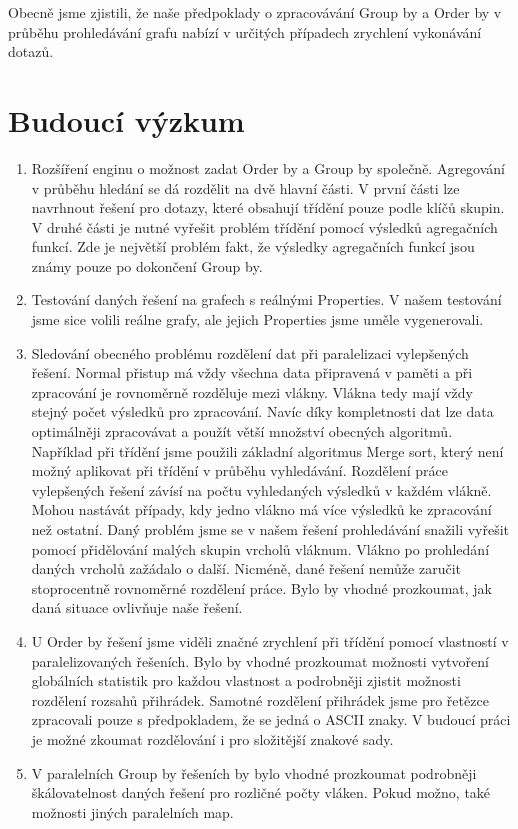 Obecně jsme zjistili, že naše předpoklady o zpracovávání Group by a Order by v průběhu prohledávání grafu nabízí v určitých případech zrychlení vykonávání dotazů.
\clearpage



\section{Budoucí výzkum}


\begin{enumerate}

\item Rozšíření enginu o možnost zadat Order by a Group by společně.
Agregování v průběhu hledání se dá rozdělit na dvě hlavní části.
V první části lze navrhnout řešení pro dotazy, které obsahují třídění pouze podle klíčů skupin.
V druhé části je nutné vyřešit problém třídění pomocí výsledků agregačních funkcí.
Zde je největší problém fakt, že výsledky agregačních funkcí jsou známy pouze po dokončení Group by.

\item Testování daných řešení na grafech s reálnými Properties.
V našem testování jsme sice volili reálne grafy, ale jejich Properties jsme uměle vygenerovali.

\item Sledování obecného problému rozdělení dat při paralelizaci vylepšených řešení. 
Normal přistup má vždy všechna data připravená v paměti a při zpracování je rovnoměrně rozděluje mezi vlákny.
Vlákna tedy mají vždy stejný počet výsledků pro zpracování.
Navíc díky kompletnosti dat lze data optimálněji zpracovávat a použít větší množství obecných algoritmů.
Například při třídění jsme použili základní algoritmus Merge sort, který není možný aplikovat při třídění v průběhu vyhledávání.  
Rozdělení práce vylepšených řešení závísí na počtu vyhledaných výsledků v každém vlákně.
Mohou nastávát případy, kdy jedno vlákno má více výsledků ke zpracování než ostatní. 
Daný problém jsme se v našem řešení prohledávání snažili vyřešit pomocí přidělování malých skupin vrcholů vláknum.
Vlákno po prohledání daných vrcholů zažádalo o další.
Nicméně, dané řešení nemůže zaručit stoprocentně rovnoměrné rozdělení práce.
Bylo by vhodné prozkoumat, jak daná situace ovlivňuje naše řešení.

\item U Order by řešení jsme viděli značné zrychlení při třídění pomocí vlastností v paralelizovaných řešeních.
Bylo by vhodné prozkoumat možnosti vytvoření globálních statistik pro každou vlastnost a podrobněji zjistit možnosti rozdělení rozsahů přihrádek.
Samotné rozdělení přihrádek jsme pro řetězce zpracovali pouze s předpokladem, že se jedná o ASCII znaky.
V budoucí práci je možné zkoumat rozdělování i pro složitější znakové sady.

\item V paralelních Group by řešeních by bylo vhodné prozkoumat podrobněji škálovatelnost daných řešení pro rozličné počty vláken.
Pokud možno, také možnosti jiných paralelních map.
 
\end{enumerate}